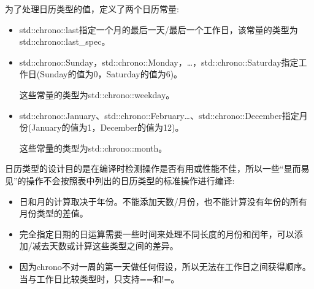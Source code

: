 为了处理日历类型的值，定义了两个日历常量:

\begin{itemize}
\item 
std::chrono::last指定一个月的最后一天/最后一个工作日，该常量的类型为std::chrono::last\_spec。

\item 
std::chrono::Sunday，std::chrono::Monday，…，std::chrono::Saturday指定工作日(Sunday的值为0，Saturday的值为6)。

这些常量的类型为std::chrono::weekday。

\item 
std::chrono::January、std::chrono::February…、std::chrono::December指定月份(January的值为1，December的值为12)。

这些常量的类型为std::chrono::month。
\end{itemize}


日历类型的设计目的是在编译时检测操作是否有用或性能不佳，所以一些“显而易见”的操作不会按照表中列出的日历类型的标准操作进行编译:

\begin{itemize}
\item 
日和月的计算取决于年份。不能添加天数/月份，也不能计算没有年份的所有月份类型的差值。

\item 
完全指定日期的日运算需要一些时间来处理不同长度的月份和闰年，可以添加/减去天数或计算这些类型之间的差异。

\item 
因为chrono不对一周的第一天做任何假设，所以无法在工作日之间获得顺序。当与工作日比较类型时，只支持==和!=。
\end{itemize}

